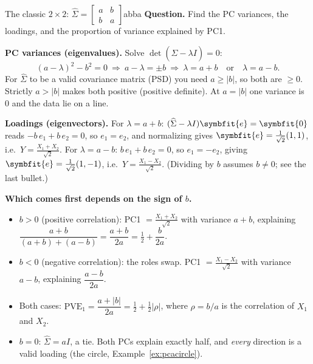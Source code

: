 \documentclass[11pt]{article}
\newcommand{\bm}[1]{\symbfit{#1}}
\newcommand{\Sig}{\widehat{\Sigma}}
\begin{document}
\begin{example}{The classic $2\times2$: $\Sig=\begin{bmatrix}a&b\\b&a\end{bmatrix}$}{abba}
\textbf{Question.} Find the PC variances, the loadings, and the proportion of variance explained by PC1.

\textbf{PC variances (eigenvalues).} Solve $\det(\Sig-\lambda I)=0$:
\[
(a-\lambda)^2-b^2=0\ \Longrightarrow\ a-\lambda=\pm b\ \Longrightarrow\ \lambda=a+b\quad\text{or}\quad\lambda=a-b .
\]
For $\Sig$ to be a valid covariance matrix (PSD) you need $a\ge|b|$, so both are $\ge0$. Strictly $a>|b|$ makes both positive
(positive definite). At $a=|b|$ one variance is $0$ and the data lie on a line.

\textbf{Loadings (eigenvectors).} For $\lambda=a+b$: $(\Sig-\lambda I)\bm e=\bm0$ reads $-b\,e_1+b\,e_2=0$, so $e_1=e_2$, and normalizing
gives $\bm e=\tfrac1{\sqrt2}(1,1)$, i.e.\ $Y=\tfrac{X_1+X_2}{\sqrt2}$. For $\lambda=a-b$: $b\,e_1+b\,e_2=0$, so $e_1=-e_2$, giving $\bm e=\tfrac1{\sqrt2}(1,-1)$, i.e.\ $Y=\tfrac{X_1-X_2}{\sqrt2}$.
(Dividing by $b$ assumes $b\ne0$; see the last bullet.)

\textbf{Which comes first depends on the sign of $b$.}
\begin{itemize}[nosep]
\item $b>0$ (positive correlation): PC1 $=\tfrac{X_1+X_2}{\sqrt2}$ with variance $a+b$, explaining
$\dfrac{a+b}{(a+b)+(a-b)}=\dfrac{a+b}{2a}=\tfrac12+\dfrac{b}{2a}$.
\item $b<0$ (negative correlation): the roles swap. PC1 $=\tfrac{X_1-X_2}{\sqrt2}$ with variance $a-b$, explaining $\dfrac{a-b}{2a}$.
\item Both cases: $\boxed{\text{PVE}_1=\dfrac{a+|b|}{2a}=\tfrac12+\tfrac12|\rho|}$, where $\rho=b/a$ is the correlation of $X_1$ and $X_2$.
\item $b=0$: $\Sig=aI$, a tie. Both PCs explain exactly half, and \emph{every} direction is a valid loading (the circle, Example~\ref{ex:pcacircle}).
\end{itemize}
\end{example}
\end{document}
